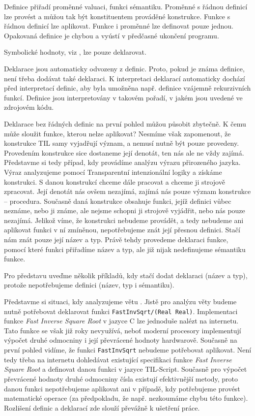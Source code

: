Definice přiřadí proměnné valuaci, funkci sémantiku. Proměnné s řádnou definicí lze provést
a můžou tak být konstituentem prováděné konstrukce. Funkce s řádnou definicí lze aplikovat. Funkce
i proměnné lze definovat pouze jednou. Opakovaná definice je chybou a vyústí v předčasné ukončení
programu.

Symbolické hodnoty, viz , lze pouze deklarovat.

Deklarace jsou automaticky odvozeny z definic. Proto, pokud je známa definice, není třeba dodávat
také deklaraci. K interpretaci deklarací automaticky dochází před interpretací definic, aby byla
umožněna např. definice vzájemně rekurzivních funkcí. Definice jsou interpretovány v takovém
pořadí, v jakém jsou uvedené ve zdrojovém kódu.

Deklarace bez řádných definic na první pohled můžou působit zbytečně. K čemu může sloužit funkce,
kterou nelze aplikovat? Nesmíme však zapomenout, že konstrukce TIL samy vyjadřují význam, a nemusí
nutně být pouze provedeny. Provedením konstrukce sice dostaneme její denotát, ten nás ale ne
vždy zajímá. Představme si tedy případ, kdy provádíme analýzu výrazu přirozeného jazyka. Výraz
analyzujeme pomocí Transparentní intenzionální logiky a získáme konstrukci. S danou konstrukcí
chceme dále pracovat a chceme ji strojově zpracovat. Její denotát nás ovšem nezajímá, zajímá nás
pouze význam konstrukce -- procedura. Současně daná konstrukce obsahuje funkci, jejíž definici vůbec
neznáme, nebo ji známe, ale nejsme schopni ji strojově vyjádřit, nebo nás pouze nezajímá. Jelikož
víme, že konstrukci nebudeme provádět, a tedy nebudeme ani aplikovat funkci v ní zmíněnou,
nepotřebujeme znát její přesnou definici. Stačí nám znát pouze její název a typ. Právě tehdy
provedeme deklaraci funkce, pomocí které funkci přiřadíme název a typ, ale již nijak nedefinujeme
sémantiku funkce.

Pro představu uveďme několik příkladů, kdy stačí dodat deklaraci (název a typ), protože
nepotřebujeme definici (název, typ i sémantiku).

Představme si situaci, kdy analyzujeme větu . Jistě pro analýzu věty budeme
nutně potřebovat deklarovat funkci \lstinline{FastInvSqrt/(Real Real)}. Implementaci funkce
\textit{Fast Inverse Square Root} v jazyce C lze jednoduše nalézt na internetu. Tato funkce se však
již roky nevyužívá, neboť moderní procesory implementují výpočet druhé odmocniny i její převrácené
hodnoty hardwarově. Současně na první pohled vidíme, že funkci \lstinline{FastInvSqrt} nebudeme
potřebovat aplikovat. Není tedy třeba na internetu dohledávat existující specifikaci funkce
\textit{Fast Inverse Square Root} a definovat danou funkci v jazyce TIL-Script. Současně pro výpočet
převrácené hodnoty druhé odmocniny čísla existují efektivnější metody, proto danou funkci
nepotřebujeme aplikovat ani v případě, kdy potřebujeme provést matematické operace (za předpokladu,
že např. nezkoumáme chybu této funkce). Rozlišení definic a deklarací zde slouží převážně k ušetření
práce.

